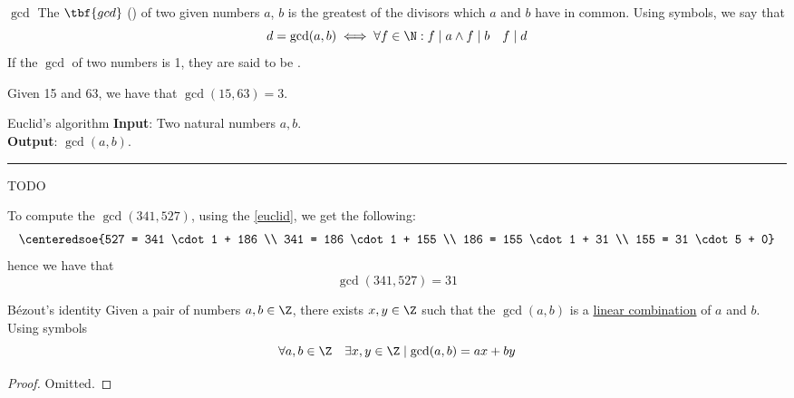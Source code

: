 \documentclass[a4paper, 12pt]{report}
\begin{document}
    \begin{frameddefn}[label={gcd}]{$\gcd$}
        The $\tbf{gcd}$ () of two given numbers $a$, $b$ is the greatest of the divisors which $a$ and $b$ have in common. Using symbols, we say that $$d = \gcd(a, b) \iff \forall f \in \N : f \mid a \land f \mid b \quad f \mid d$$ If the $\gcd$ of two numbers is 1, they are said to be .
    \end{frameddefn}

    \begin{example}[$\gcd$]
        Given 15 and 63, we have that $\gcd(15, 63) = 3$.
    \end{example}

    \begin{framedalgo}[label={euclid}]{Euclid's algorithm}
        \textbf{Input}: Two natural numbers $a, b$.\\
        \textbf{Output}: $\gcd(a, b)$.

        \hrule
        \begin{algorithmic}[1]
                \State TODO
            \EndFunction
        \end{algorithmic}
    \end{framedalgo}

    \begin{example}
        \label{euclid example}
        To compute the $\gcd(341, 527)$, using the \cref{euclid}, we get the following: $$\centeredsoe{527 = 341 \cdot 1 + 186 \\ 341 = 186 \cdot 1 + 155 \\ 186 = 155 \cdot 1 + 31 \\ 155 = 31 \cdot 5 + 0}$$ hence we have that $$\gcd(341, 527) = 31$$
    \end{example}

    \begin{framedlem}[label={bezout}]{Bézout's identity}
        Given a pair of numbers $a, b \in \Z$, there exists $x, y \in \Z$ such that the $\gcd(a, b)$ is a \href{https://en.wikipedia.org/wiki/Linear_combination}{linear combination} of $a$ and $b$. Using symbols $$\forall a, b \in \Z \quad \exists x, y \in \Z \mid \gcd(a, b) = ax + by$$
    \end{framedlem}

    \begin{proof}
        Omitted.
    \end{proof}
\end{document}
